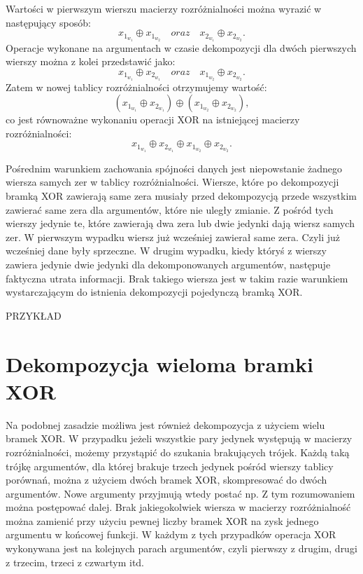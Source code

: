 Wartości w pierwszym wierszu macierzy rozróżnialności można wyrazić w następujący sposób:
\begin{equation}
x_{1_{w_1}} \oplus x_{1_{w_2}} \quad oraz \quad x_{2_{w_1}} \oplus x_{2_{w_2}}.
\end{equation}
Operacje wykonane na argumentach w czasie dekompozycji dla dwóch pierwszych wierszy można z kolei przedstawić jako:
\begin{equation}
x_{1_{w_1}} \oplus x_{2_{w_1}} \quad oraz \quad x_{1_{w_2}} \oplus x_{2_{w_2}}.
\end{equation}
Zatem w nowej tablicy rozróżnialności otrzymujemy wartość:
\begin{equation}
(x_{1_{w_1}} \oplus x_{2_{w_1}}) \oplus (x_{1_{w_2}} \oplus x_{2_{w_2}}),
\end{equation}
 co jest równoważne wykonaniu operacji XOR na istniejącej macierzy rozróżnialności:
\begin{equation}
x_{1_{w_1}} \oplus x_{2_{w_1}} \oplus x_{1_{w_2}} \oplus x_{2_{w_2}}.
\end{equation}

Pośrednim warunkiem zachowania spójności danych jest niepowstanie żadnego wiersza samych zer w tablicy rozróżnialności.
Wiersze,
które po dekompozycji bramką XOR zawierają same zera musiały przed dekompozycją przede wszystkim zawierać same zera dla argumentów,
które nie uległy zmianie.
Z pośród tych wierszy jedynie te,
które zawierają dwa zera lub dwie jedynki dają wiersz samych zer.
W pierwszym wypadku wiersz już wcześniej zawierał same zera.
Czyli już wcześniej dane były sprzeczne.
W drugim wypadku,
kiedy któryś z wierszy zawiera jedynie dwie jedynki dla dekomponowanych argumentów,
następuje faktyczna utrata informacji.
Brak takiego wiersza jest w takim razie warunkiem wystarczającym do istnienia dekompozycji pojedynczą bramką XOR.

PRZYKŁAD


\section{Dekompozycja wieloma bramki XOR}

Na podobnej zasadzie możliwa jest również dekompozycja z użyciem wielu bramek XOR.
W przypadku jeżeli wszystkie pary jedynek występują w macierzy rozróżnialności,
możemy przystąpić do szukania brakujących trójek.
Każdą taką trójkę argumentów,
dla której brakuje trzech jedynek pośród wierszy tablicy porównań,
można z użyciem dwóch bramek XOR,
skompresować do dwóch argumentów.
Nowe argumenty przyjmują wtedy postać np.
 Z tym rozumowaniem można postępować dalej.
Brak jakiegokolwiek wiersza w macierzy rozróżnialność można zamienić przy użyciu pewnej liczby bramek XOR na zysk jednego argumentu w końcowej funkcji.
W każdym z tych przypadków operacja XOR wykonywana jest na kolejnych parach argumentów,
czyli pierwszy z drugim,
drugi z trzecim,
trzeci z czwartym itd.


